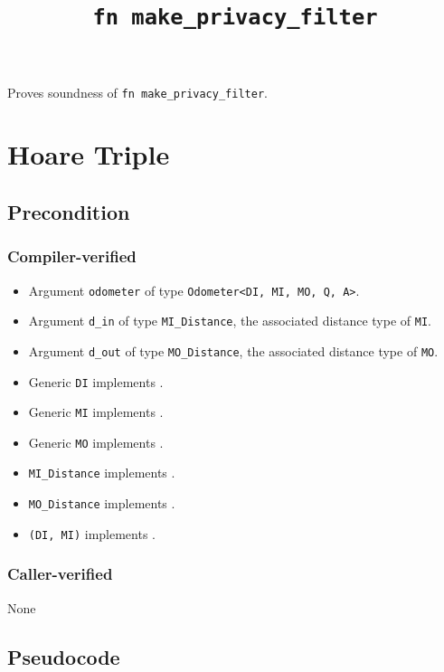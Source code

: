 \documentclass{article}
\title{\texttt{fn make\_privacy\_filter}}
\author{\MichaelShoemateAuthor}
\date{}
\begin{document}
\maketitle

\contrib
Proves soundness of \texttt{fn make\_privacy\_filter}.

\section{Hoare Triple}
\subsection*{Precondition}
\subsubsection*{Compiler-verified}
\begin{itemize}
    \item Argument \texttt{odometer} of type \texttt{Odometer<DI, MI, MO, Q, A>}.
    \item Argument \texttt{d\_in} of type \texttt{MI\_Distance}, the associated distance type of \texttt{MI}.
    \item Argument \texttt{d\_out} of type \texttt{MO\_Distance}, the associated distance type of \texttt{MO}.
    \item Generic \texttt{DI} implements .
    \item Generic \texttt{MI} implements .
    \item Generic \texttt{MO} implements .
    \item \texttt{MI\_Distance} implements .
    \item \texttt{MO\_Distance} implements .
    \item \texttt{(DI, MI)} implements .
\end{itemize}

\subsubsection*{Caller-verified}
None

\subsection*{Pseudocode}

\end{document}
